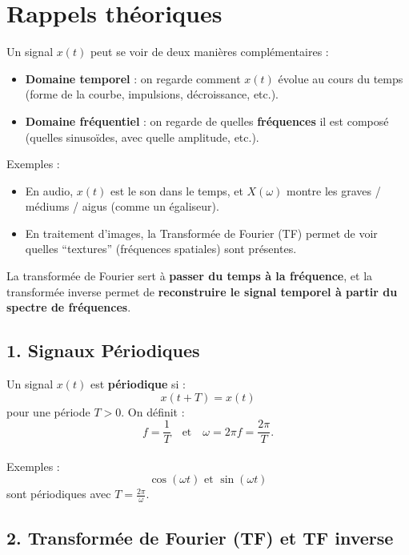 
\section*{Rappels théoriques}

Un signal $x(t)$ peut se voir de deux manières complémentaires :
\begin{itemize}
    \item \textbf{Domaine temporel} : on regarde comment $x(t)$ évolue au cours du temps (forme de la courbe, impulsions, décroissance, etc.).
    \item \textbf{Domaine fréquentiel} : on regarde de quelles \textbf{fréquences} il est composé (quelles sinusoïdes, avec quelle amplitude, etc.). \\
\end{itemize}

Exemples :
\begin{itemize}
    \item En audio, $x(t)$ est le son dans le temps, et $X(\omega)$ montre les graves / médiums / aigus (comme un égaliseur).
    \item En traitement d’images, la Transformée de Fourier (TF) permet de voir quelles “textures” (fréquences spatiales) sont présentes. \\
\end{itemize}

La transformée de Fourier sert à \textbf{passer du temps à la fréquence}, et la transformée inverse permet de \textbf{reconstruire le signal temporel à partir du spectre de fréquences}.


\subsection*{1. Signaux Périodiques}

Un signal $x(t)$ est \textbf{périodique} si :
\[
x(t+T) = x(t)
\]
pour une période $T>0$.  
On définit :
\[
f = \frac{1}{T} \quad \text{et} \quad \omega = 2\pi f = \frac{2\pi}{T}.
\] \\

Exemples :
\[
\cos(\omega t) \text{ et } \sin(\omega t)
\]
sont périodiques avec $T = \frac{2\pi}{\omega}$.


\subsection*{2. Transformée de Fourier (TF) et TF inverse}

